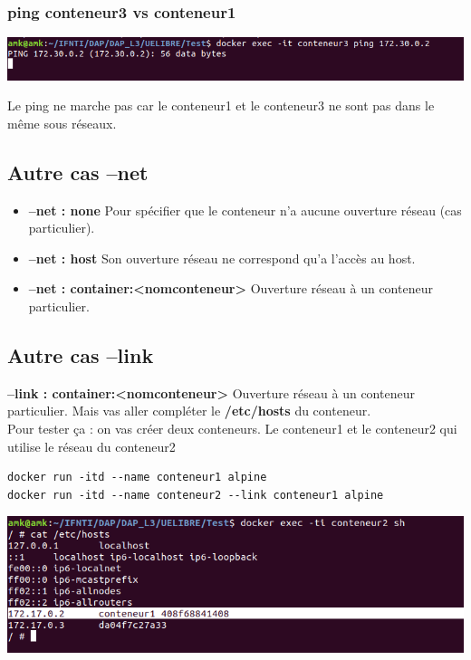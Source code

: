 \documentclass[12pt,a4paper]{article}
\begin{document}
\subsubsection{ping conteneur3 vs conteneur1}
\begin{center}
\includegraphics[scale=0.5]{img/ping_c3_c1.png}
\end{center}
Le ping ne marche pas car le conteneur1 et le conteneur3 ne sont pas dans le même sous
 réseaux.
 
\subsection{Autre cas --net}
\begin{itemize}
\item \textbf{--net : none} Pour spécifier que le conteneur n'a aucune ouverture réseau 
(cas particulier).
\item \textbf{--net : host} Son ouverture réseau ne correspond qu'a l'accès au host.
\item \textbf{--net : container:<nomconteneur>} Ouverture réseau à un conteneur particulier.
\end{itemize}

\subsection{Autre cas --link}
\textbf{--link : container:<nomconteneur>} Ouverture réseau à un conteneur particulier. Mais vas aller compléter le \textbf{/etc/hosts} du conteneur.\\
Pour tester ça : on vas créer deux conteneurs. Le conteneur1 et le conteneur2 qui
utilise le réseau du conteneur2
\begin{verbatim}
docker run -itd --name conteneur1 alpine
docker run -itd --name conteneur2 --link conteneur1 alpine
\end{verbatim}
\begin{center}
\includegraphics[scale=0.5]{img/link_c1.png}
\end{center}
\end{document}

